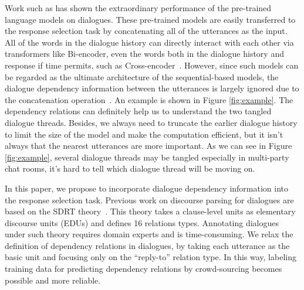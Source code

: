  
Work such as \cite{abs-1908-04812,vig2019comparison} has shown the 
extraordinary performance of the pre-trained language models on dialogues. 
These pre-trained models are easily transferred to the response selection 
task by concatenating all of the utterances as the input. 
All of the words in the dialogue history can directly interact with each other 
via transformers like Bi-encoder, even the words both in the dialogue history 
and response if time permits, such as Cross-encoder~\cite{humeau2019poly}. 
However, since such models can be regarded as the ultimate 
architecture of the sequential-based models, the dialogue dependency 
information between the utterances is largely ignored due to the 
concatenation operation~\cite{WuWXZL17}. An example is shown in Figure \ref{fig:example}. The dependency relations can definitely help us to understand the two tangled dialogue threads.
Besides, we always need to truncate the earlier dialogue history 
to limit the size of the model and make the computation efficient, 
but it isn't always that the nearest utterances are more important. 
As we can see in Figure \ref{fig:example}, several dialogue threads may 
be tangled especially in multi-party chat rooms, 
it's hard to tell which dialogue thread will be moving on.

In this paper, we propose to incorporate dialogue dependency information 
into the response selection task. Previous work on discourse parsing for 
dialogues are based on the SDRT theory~\cite{0031949}. This theory takes 
a clause-level units as elementary discourse units (EDUs) and defines 16 relations types. Annotating dialogues under such theory requires domain experts and is time-consuming. We relax the definition of dependency relations in dialogues, 
by taking each utterance as the basic unit and focusing only on 
the ``reply-to'' relation type. In this way, labeling training data for 
predicting dependency relations by crowd-sourcing becomes possible and more
reliable.

